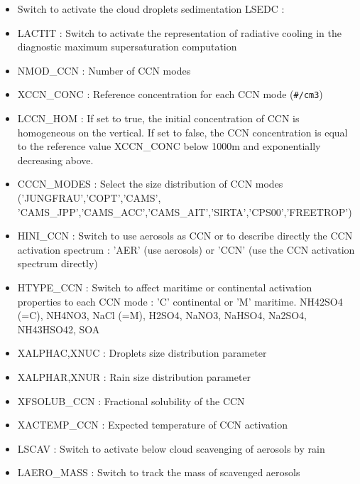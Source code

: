 \begin{itemize}
\item
{}
Switch to activate the cloud droplets sedimentation
LSEDC : 
\item
{}
LACTIT : Switch to activate the representation of radiative cooling in the diagnostic maximum supersaturation computation
\item
{}
NMOD\_CCN : Number of CCN modes
\item
{}
XCCN\_CONC : Reference concentration for each CCN mode (\verb?#/cm3?)
\item
{}
LCCN\_HOM : If set to true, the initial concentration of CCN is homogeneous on the vertical. If set to false, the CCN concentration is equal to the reference value XCCN\_CONC below 1000m and exponentially decreasing above.
\item
{}
CCCN\_MODES : Select the size distribution of CCN modes ('JUNGFRAU','COPT','CAMS',\\
'CAMS\_JPP','CAMS\_ACC','CAMS\_AIT','SIRTA','CPS00','FREETROP')
\item
{}
HINI\_CCN : Switch to use aerosols as CCN or to describe directly the CCN activation spectrum : 'AER' (use aerosols) or 'CCN' (use the CCN activation spectrum directly)
\item
{}
HTYPE\_CCN : Switch to affect maritime or continental activation properties to each CCN mode : 'C' continental or 'M' maritime. NH42SO4 (=C), NH4NO3, NaCl (=M), H2SO4, NaNO3, NaHSO4, Na2SO4, NH43HSO42, SOA
\item
{}
XALPHAC,XNUC : Droplets size distribution parameter
\item
{}
XALPHAR,XNUR : Rain size distribution parameter
\item
{}
XFSOLUB\_CCN : Fractional solubility of the CCN
\item
{}
XACTEMP\_CCN : Expected temperature of CCN activation
\item
{}
LSCAV : Switch to activate below cloud scavenging of aerosols by rain
\item
{}
LAERO\_MASS : Switch to track the mass of scavenged aerosols

\end{itemize}
